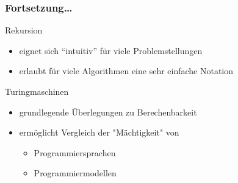 \begin{frame}
	\frametitle{Fortsetzung\ldots}
	\begin{block}{Rekursion}
		\begin{itemize}
          \item eignet sich ``intuitiv'' für viele Problemstellungen
		  \item erlaubt für viele Algorithmen eine sehr einfache Notation
		\end{itemize}
   	\end{block}
  \pause
	\begin{block}{Turingmaschinen}
  	\begin{itemize}
			\item grundlegende Überlegungen zu Berechenbarkeit
			\item ermöglicht Vergleich der "Mächtigkeit" von
			\\  		\begin{itemize}
							\item Programmiersprachen
							\item Programmiermodellen
						\end{itemize}
		\end{itemize}
	\end{block}
\end{frame}

